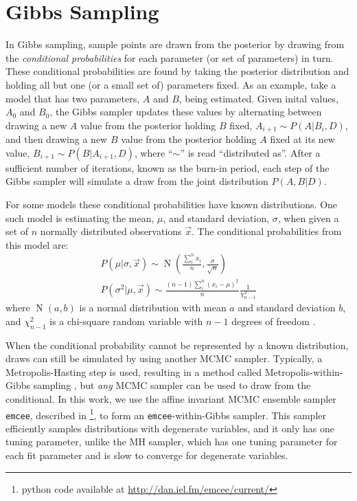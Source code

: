 \section{Gibbs Sampling}
In Gibbs sampling, sample points are drawn from the posterior by drawing from the {\em conditional probabilities} for each parameter (or set of parameters) in turn. These conditional probabilities are found by taking the posterior distribution and holding all but one (or a small set of) parameters fixed.  As an example, take a model that has two parameters, $A$ and $B$, being estimated. Given inital values, $A_0$ and $B_0$, the Gibbs sampler updates these values by alternating between drawing a new $A$ value from the posterior holding $B$ fixed, $A_{i+1} \sim P(A|B_i,D)$, and then drawing a new $B$ value from the posterior holding $A$ fixed at its new value, $B_{i+1} \sim P(B|A_{i+1},D)$, where ``$\sim$'' is read ``distributed as''. After a sufficient number of iterations, known as the burn-in period, each step of the Gibbs sampler will simulate a draw from the joint distribution $P(A,B|D)$.

For some models these conditional probabilities have known distributions. One such model is estimating the mean, $\mu$, and standard deviation, $\sigma$, when given a set of $n$ normally distributed observations $\vec{x}$. The conditional probabilities from this model are:
\begin{eqnarray}
 P(\mu|\sigma,\vec{x}) \sim \operatorname{N}\left( \frac{\sum_i^n x_i}{n}, \frac{\sigma}{\sqrt{n}} \right) \\
 P(\sigma^2|\mu,\vec{x}) \sim \frac{(n-1)\sum_i^n(x_i-\mu)^2}{n}\frac{1}{\chi_{n-1}^2} 
\end{eqnarray}
where $\operatorname{N}(a,b)$ is a normal distribution with mean $a$ and standard deviation $b$, and $\chi_{n-1}^2$ is a chi-square random variable with $n-1$ degrees of freedom \citep{Gelman:2006}.

When the conditional probability cannot be represented by a known distribution, draws can still be simulated by using another MCMC sampler. Typically, a Metropolis-Hasting \citep[MH;][]{Hastings:1970} step is used, resulting in a method called Metropolis-within-Gibbs sampling \citep{Metropolis:1953}, but {\em any} MCMC sampler can be used to draw from the conditional.  In this work, we use the affine invariant MCMC ensemble sampler \texttt{emcee}, described in \citet{Foreman-Mackey:2013}\footnote{python code available at \href{http://dan.iel.fm/emcee/current/}{http://dan.iel.fm/emcee/current/}}, to form an \texttt{emcee}-within-Gibbs sampler.  This sampler efficiently samples distributions with degenerate variables, and it only has one tuning parameter, unlike the MH sampler, which has one tuning parameter for each fit parameter and is slow to converge for degenerate variables.

